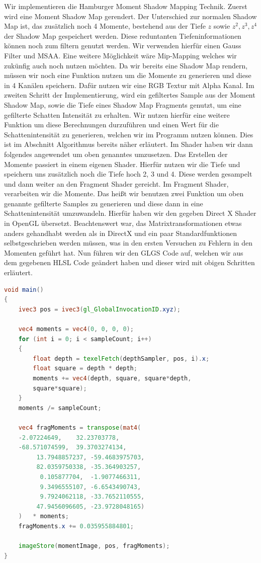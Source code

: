 \documentclass[runningheaders,a4paper]{llncs}
\begin{document}
Wir implementieren die Hamburger Moment Shadow Mapping Technik. 
Zuerst wird eine Moment Shadow Map gerendert. Der Unterschied zur normalen Shadow Map ist, das zusätzlich noch 4 Momente, bestehend aus der Tiefe $z$ sowie $z^2,z^3,z^4$ der Shadow Map gespeichert werden. Diese reduntanten Tiefeninformationen können noch zum filtern genutzt werden. Wir verwenden hierfür einen Gauss Filter und MSAA. Eine weitere Möglichkeit wäre Mip-Mapping welches wir zukünfig auch noch nutzen möchten. Da wir bereits eine Shadow Map rendern, müssen wir  noch eine Funktion nutzen um die Momente zu generieren und diese in 4 Kanälen speichern. Dafür nutzen wir eine RGB Textur mit Alpha Kanal.
Im zweiten Schritt der Implementierung, wird ein gefiltertes Sample aus der Moment Shadow Map, sowie die Tiefe eines Shadow Map Fragments genutzt, um eine gefilterte Schatten Intensität zu erhalten.
Wir nutzen hierfür eine weitere Funktion um diese Berechnungen durzuführen und einen Wert für die Schattenintensität zu generieren, welchen wir im Programm nutzen können. Dies ist im Abschnitt Algorithmus bereits näher erläutert.
Im Shader haben wir dann folgendes angewendet um oben genanntes umzusetzen.
Das Erstellen der Momente passiert in einem eigenen Shader. Hierfür nutzen wir die Tiefe und speichern uns zusätzlich noch die Tiefe hoch 2, 3 und 4. Diese werden gesampelt und dann weiter an den Fragment Shader gereicht.
Im Fragment Shader, verarbeiten wir die Momente. Das heißt wir benutzen zwei Funktion um oben genannte gefilterte Samples zu generieren und diese dann in eine Schattenintensität umzuwandeln. Hierfür haben wir den gegeben Direct X Shader in OpenGL übersetzt. Beachtenswert war, das Matrixtransformationen etwas anders gehandhabt werden als in DirectX und ein paar Standardfunktionen selbstgeschrieben werden müssen, was in den ersten Versuchen zu Fehlern in den Momenten geführt hat. Nun führen wir den GLGS Code auf, welchen wir aus dem gegebenen HLSL Code geändert haben und dieser wird mit obigen Schritten erläutert.

\begin{lstlisting}[language=GLSL]
void main()
{
    ivec3 pos = ivec3(gl_GlobalInvocationID.xyz);

    vec4 moments = vec4(0, 0, 0, 0);
    for (int i = 0; i < sampleCount; i++)
    {
        float depth = texelFetch(depthSampler, pos, i).x;
        float square = depth * depth;
        moments += vec4(depth, square, square*depth, 
        square*square);
    }
    moments /= sampleCount;

	vec4 fragMoments = transpose(mat4(
	-2.07224649,	32.23703778,
	-68.571074599,	39.3703274134,
    	 13.7948857237,	-59.4683975703,
    	 82.0359750338,	-35.364903257,
    	  0.105877704,	-1.9077466311,
    	  9.3496555107,	-6.6543490743,
    	  9.7924062118,	-33.7652110555,
    	 47.9456096605,	-23.9728048165)
    )	* moments;
	fragMoments.x += 0.035955884801;

    imageStore(momentImage, pos, fragMoments);
}
\end{lstlisting}
\end{document}
